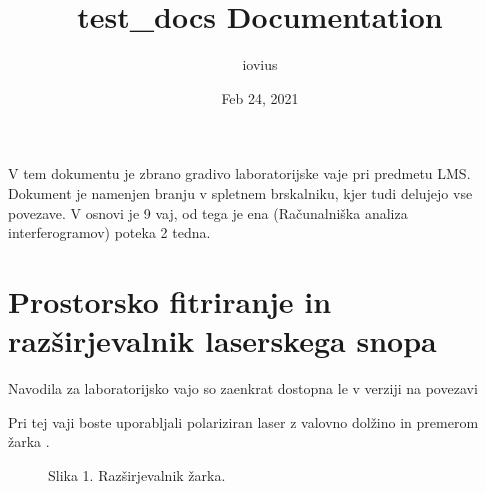 \documentclass[letterpaper,10pt,english]{sphinxmanual}
\title{test\_docs Documentation}
\date{Feb 24, 2021}
\author{iovius}
\begin{document}
\pagestyle{empty}
\sphinxmaketitle
\pagestyle{plain}
\sphinxtableofcontents
\pagestyle{normal}
\label{\detokenize{master_document::doc}}


\sphinxAtStartPar
V tem dokumentu je zbrano gradivo laboratorijske vaje pri predmetu LMS. Dokument je namenjen branju v spletnem brskalniku, kjer tudi delujejo vse povezave. V osnovi je 9 vaj, od tega je ena (Računalniška analiza interferogramov) poteka 2 tedna.


\chapter{Prostorsko fitriranje in razširjevalnik laserskega snopa}
\label{\detokenize{prostorskofiltriranje:prostorsko-fitriranje-in-razsirjevalnik-laserskega-snopa}}\label{\detokenize{prostorskofiltriranje:prostorskofiltriranje}}\label{\detokenize{prostorskofiltriranje::doc}}
\sphinxAtStartPar
Navodila za laboratorijsko vajo so zaenkrat dostopna le v  verziji na povezavi 

\sphinxAtStartPar
Pri tej vaji boste uporabljali polariziran  laser z valovno dolžino  in premerom žarka .

\begin{figure}[htbp]
\centering
\capstart

\noindent{}
\caption{Slika 1. Razširjevalnik žarka.}\label{\detokenize{prostorskofiltriranje:id1}}\end{figure}
\end{document}
